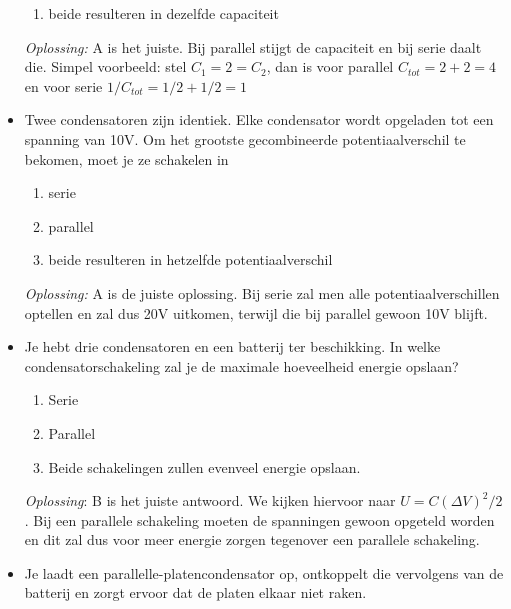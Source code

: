\documentclass[12pt,a4paper]{article}
\begin{document}
\begin{itemize}
\begin{enumerate}[label=\alph*]
		\item beide resulteren in dezelfde capaciteit
	\end{enumerate}
	\textit{Oplossing:} A is het juiste. Bij parallel stijgt de capaciteit en bij serie daalt die. Simpel voorbeeld: stel $C_1 = 2 = C_2$, dan is voor parallel \(C_{tot} = 2 + 2 = 4\) en voor serie \(1/C_{tot} = 1/2 + 1/2 = 1\)
	\item Twee condensatoren zijn identiek. Elke condensator wordt opgeladen tot een spanning van 10V. Om het grootste gecombineerde potentiaalverschil te bekomen, moet je ze schakelen in
	\begin{enumerate}[label=\alph*]
		\item serie
		\item parallel
		\item beide resulteren in hetzelfde potentiaalverschil
	\end{enumerate}
	\textit{Oplossing:} A is de juiste oplossing. Bij serie zal men alle potentiaalverschillen optellen en zal dus 20V uitkomen, terwijl die bij parallel gewoon 10V blijft. 
	\item Je hebt drie condensatoren en een batterij ter beschikking. In welke condensatorschakeling zal je de maximale hoeveelheid energie opslaan?
	\begin{enumerate}[label=\alph*]
		\item Serie
		\item Parallel
		\item Beide schakelingen zullen evenveel energie opslaan.
	\end{enumerate}
	\textit{Oplossing}: B is het juiste antwoord. We kijken hiervoor naar \(U = C(\Delta V)^2 / 2\). Bij een parallele schakeling moeten de spanningen gewoon opgeteld worden en dit zal dus voor meer energie zorgen tegenover een parallele schakeling.
	\item Je laadt een parallelle-platencondensator op, ontkoppelt die vervolgens van de batterij en zorgt ervoor dat de platen elkaar niet raken. 
	

\end{itemize}
\end{document}
